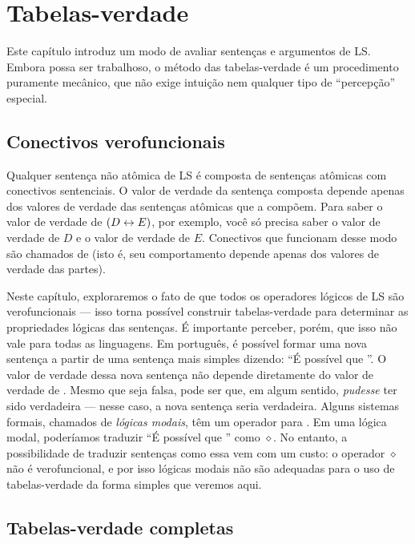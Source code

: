 \chapter{Tabelas-verdade}
\label{ch.TruthTables}

Este capítulo introduz um modo de avaliar sentenças e argumentos de LS. Embora possa ser trabalhoso, o método das tabelas-verdade é um procedimento puramente mecânico, que não exige intuição nem qualquer tipo de \enquote{percepção} especial.

\section{Conectivos verofuncionais}

Qualquer sentença não atômica de LS é composta de sentenças atômicas com conectivos sentenciais. O valor de verdade da sentença composta depende apenas dos valores de verdade das sentenças atômicas que a compõem. Para saber o valor de verdade de $(D\leftrightarrow E)$, por exemplo, você só precisa saber o valor de verdade de $D$ e o valor de verdade de $E$. Conectivos que funcionam desse modo são chamados de  (isto é, seu comportamento depende apenas dos valores de verdade das partes).

Neste capítulo, exploraremos o fato de que todos os operadores lógicos de LS são verofuncionais — isso torna possível construir tabelas-verdade para determinar as propriedades lógicas das sentenças. É importante perceber, porém, que isso não vale para todas as linguagens. Em português, é possível formar uma nova sentença a partir de uma sentença mais simples  dizendo: \enquote{É possível que }. O valor de verdade dessa nova sentença não depende diretamente do valor de verdade de . Mesmo que  seja falsa, pode ser que, em algum sentido,  \emph{pudesse} ter sido verdadeira — nesse caso, a nova sentença seria verdadeira. Alguns sistemas formais, chamados de \emph{lógicas modais}, têm um operador para . Em uma lógica modal, poderíamos traduzir \enquote{É possível que } como {\large $\diamond$}. No entanto, a possibilidade de traduzir sentenças como essa vem com um custo: o operador {\large $\diamond$} não é verofuncional, e por isso lógicas modais não são adequadas para o uso de tabelas-verdade da forma simples que veremos aqui.


\section{Tabelas-verdade completas}

